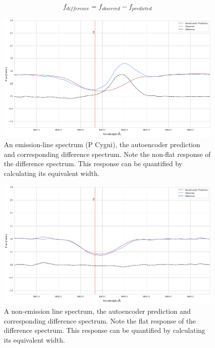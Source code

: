 \begin{equation}
   f_{difference} = f_{observed} - f_{predicted}
\end{equation}

\begin{figure}[!htb]
\centering
\includegraphics[scale=0.45]{figures/normal difference.png}
\caption{An emission-line spectrum (P Cygni), the autoencoder prediction and corresponding difference spectrum. Note the non-flat response of the difference spectrum. This response can be quantified by calculating its equivalent width.}
\end{figure}

\begin{figure}[!htb]
\centering
\includegraphics[scale=0.45]{figures/non emission difference.png}
\caption{A non-emission line spectrum, the autoencoder prediction and corresponding difference spectrum. Note the flat response of the difference spectrum. This response can be quantified by calculating its equivalent width.}
\end{figure}

